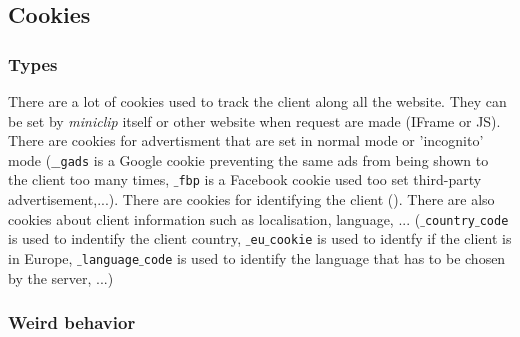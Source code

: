 \documentclass{article}
\begin{document}
\subsection{Cookies}
\label{sub:cookies}

\subsubsection{Types}

There are a lot of cookies used to track the client along all the website. They can be set by \textit{miniclip} itself or other website when request are made (IFrame or JS). There are cookies for advertisment that are set in normal mode or 'incognito' mode (\texttt{$\_\_$gads} is a Google cookie preventing the same ads from being shown to the client too many times, \texttt{$\_$fbp} is a Facebook cookie used too set third-party advertisement,...). There are cookies for identifying the client (). There are also cookies about client information such as localisation, language, ... (\texttt{$\_$country$\_$code} is used to indentify the client country, \texttt{$\_$eu$\_$cookie} is used to identfy if the client is in Europe, \texttt{$\_$language$\_$code} is used to identify the language that has to be chosen by the server, ...)

\subsubsection{Weird behavior}
\end{document}
